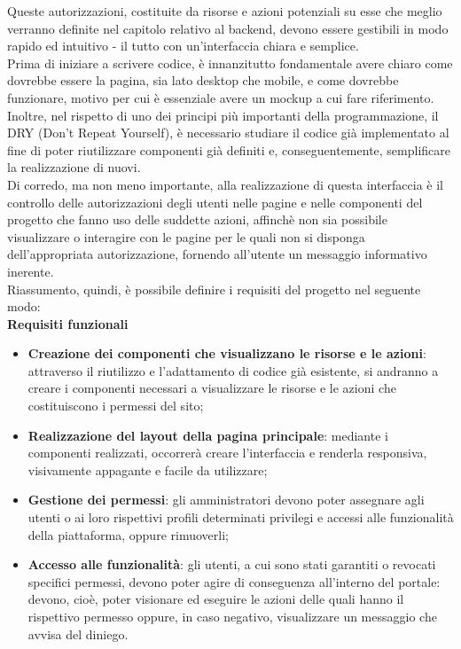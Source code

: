 \documentclass[a4paper, 12pt]{book}
\begin{document}
Queste autorizzazioni, costituite da risorse e azioni potenziali su esse che meglio verranno definite nel capitolo relativo al backend, devono
essere gestibili in modo rapido ed intuitivo - il tutto con un'interfaccia chiara e semplice.\\

Prima di iniziare a scrivere codice, è innanzitutto fondamentale avere chiaro come dovrebbe essere la pagina, sia lato desktop che mobile, e
come dovrebbe funzionare, motivo per cui è essenziale avere un mockup a cui fare riferimento. Inoltre, nel rispetto di uno dei principi più
importanti della programmazione, il DRY (Don't Repeat Yourself), è necessario studiare il codice già implementato al fine di poter riutilizzare
componenti già definiti e, conseguentemente, semplificare la realizzazione di nuovi.\\

Di corredo, ma non meno importante, alla realizzazione di questa interfaccia è il controllo delle autorizzazioni degli utenti nelle pagine e nelle
componenti del progetto che fanno uso delle suddette azioni, affinchè non sia possibile visualizzare o interagire con le pagine per le quali non si disponga dell'appropriata
autorizzazione, fornendo all'utente un messaggio informativo inerente.\\

Riassumento, quindi, è possibile definire i requisiti del progetto nel seguente modo:\\

{\Large\textbf{Requisiti funzionali}}

\begin{itemize}
  \item \textbf{Creazione dei componenti che visualizzano le risorse e le azioni}: attraverso il riutilizzo e l'adattamento di codice già esistente, si andranno a
        creare i componenti necessari a visualizzare le risorse e le azioni che costituiscono i permessi del sito;
  \item  \textbf{Realizzazione del layout della pagina principale}: mediante i componenti realizzati, occorrerà creare l'interfaccia e renderla responsiva,
        visivamente appagante e facile da utilizzare;
  \item \textbf{Gestione dei permessi}: gli amministratori devono poter assegnare agli utenti o ai loro rispettivi profili determinati privilegi
        e accessi alle funzionalità della piattaforma, oppure rimuoverli;
  \item \textbf{Accesso alle funzionalità}: gli utenti, a cui sono stati garantiti o revocati specifici permessi, devono poter agire di conseguenza
        all'interno del portale: devono, cioè, poter visionare ed eseguire le azioni delle quali hanno il rispettivo permesso oppure, in caso negativo,
        visualizzare un messaggio che avvisa del diniego.
\end{itemize}
\end{document}
